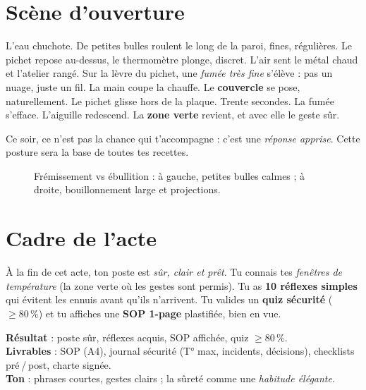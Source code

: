 \documentclass[../../main.tex]{subfiles}
\begin{document}
\section*{Scène d'ouverture}

L’eau chuchote. De petites bulles roulent le long de la paroi, fines, régulières. Le pichet repose au-dessus, le thermomètre plonge, discret. L’air sent le métal chaud et l’atelier rangé.
Sur la lèvre du pichet, une \textit{fumée très fine} s’élève : pas un nuage, juste un fil. La main coupe la chauffe. Le \textbf{couvercle} se pose, naturellement. Le pichet glisse hors de la plaque. Trente secondes. La fumée s’efface. L’aiguille redescend. La \textbf{zone verte} revient, et avec elle le geste sûr.

Ce soir, ce n’est pas la chance qui t’accompagne : c’est une \textit{réponse apprise}. Cette posture sera la base de toutes tes recettes.

\begin{figure}[!h]
  \centering
  \fbox{\rule{0pt}{0.40\textheight}\rule{0.9\textwidth}{0pt}}
  \caption{Frémissement vs ébullition : à gauche, petites bulles calmes ; à droite, bouillonnement large et projections.}
\end{figure}

\section{Cadre de l'acte}

À la fin de cet acte, ton poste est \textit{sûr, clair et prêt}. Tu connais tes \textit{fenêtres de température} (la zone verte où les gestes sont permis). Tu as \textbf{10 réflexes simples} qui évitent les ennuis avant qu’ils n’arrivent. Tu valides un \textbf{quiz sécurité} (\(\geq 80\,\%\)) et tu affiches une \textbf{SOP 1-page} plastifiée, bien en vue.

\begin{BlocObjectif}
\textbf{Résultat} : poste sûr, réflexes acquis, SOP affichée, quiz \(\geq 80\,\%\). \\
\textbf{Livrables} : SOP (A4), journal sécurité (T° max, incidents, décisions), checklists pré / post, charte signée. \\
\textbf{Ton} : phrases courtes, gestes clairs ; la sûreté comme une \textit{habitude élégante}.
\end{BlocObjectif}
\end{document}
